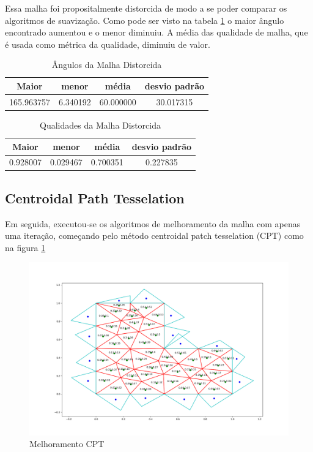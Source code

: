 Essa malha foi propositalmente distorcida de modo a se poder comparar os algoritmos de suavização. Como pode ser visto na tabela \ref{tab:angulos-malha-distorcida} o maior ângulo encontrado aumentou e o menor diminuiu. A média das qualidade de malha, que é usada como métrica da qualidade, diminuiu de valor.

\begin{table}[hb]
\centering
\par\caption{Ângulos da Malha Distorcida}
\begin{tabular}{c|c|c|c}
Maior&menor&média&desvio padrão\\\hline\hline
165.963757&6.340192&60.000000&30.017315\\\hline
\end{tabular}
\label{tab:angulos-malha-distorcida}
\end{table}



\begin{table}[hb]
\centering
\par\caption{Qualidades da Malha Distorcida}
\begin{tabular}{c|c|c|c}
Maior&menor&média&desvio padrão\\\hline\hline
0.928007&0.029467&0.700351&0.227835\\\hline
\end{tabular}
\label{tab:qualidades-malha-distorcida}
\end{table}

\newpage
\subsection{Centroidal Path Tesselation}

Em seguida, executou-se os algoritmos de melhoramento da malha com apenas uma iteração, começando pelo método centroidal patch tesselation (CPT) como na figura \ref{fig:malha-cpt}

\begin{figure}[ht]
    \centering
    \includegraphics[width=1\linewidth]{fig/malha-cpt.png}
    \caption{Melhoramento CPT}
    \label{fig:malha-cpt}
\end{figure}

